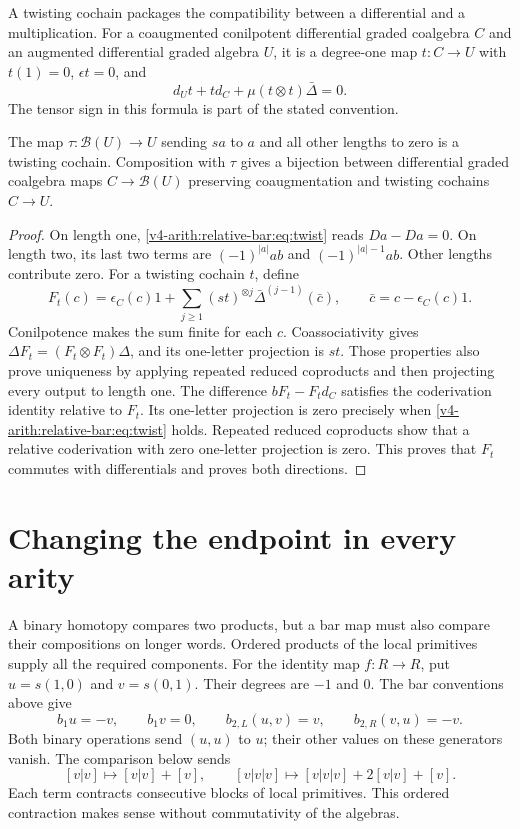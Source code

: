 A twisting cochain packages the compatibility between a differential
and a multiplication. For a coaugmented conilpotent differential
graded coalgebra $C$ and an augmented differential graded algebra $U$,
it is a degree-one map $t:C\to U$ with $t(1)=0$, $\epsilon t=0$, and
\begin{equation}\label{v4-arith:relative-bar:eq:twist}
 d_Ut+t d_C+\mu(t\otimes t)\bar\Delta=0.
\end{equation}
The tensor sign in this formula is part of the stated convention.

\begin{theorem}\label{v4-arith:relative-bar:thm:universal}
The map $\tau:\mathcal{B}(U)\to U$ sending $sa$ to $a$ and all other
lengths to zero is a twisting cochain. Composition with $\tau$ gives
a bijection between differential graded coalgebra maps
$C\to\mathcal{B}(U)$ preserving coaugmentation and twisting cochains
$C\to U$.
\end{theorem}
\begin{proof}
On length one, \eqref{v4-arith:relative-bar:eq:twist} reads $Da-Da=0$.
On length two, its last two terms are
$(-1)^{|a|}ab$ and $(-1)^{|a|-1}ab$. Other lengths contribute zero.
For a twisting cochain $t$, define
\[
 F_t(c)=\epsilon_C(c)1+
 \sum_{j\ge1}(st)^{\otimes j}\bar\Delta^{(j-1)}(\bar c),
 \qquad\bar c=c-\epsilon_C(c)1.
\]
Conilpotence makes the sum finite for each $c$. Coassociativity gives
$\Delta F_t=(F_t\otimes F_t)\Delta$, and its one-letter projection
is $st$. Those properties also prove uniqueness by applying repeated
reduced coproducts and then projecting every output to length one.
The difference $bF_t-F_td_C$ satisfies the coderivation identity
relative to $F_t$. Its one-letter projection is zero precisely when
\eqref{v4-arith:relative-bar:eq:twist} holds. Repeated reduced coproducts show that a relative
coderivation with zero one-letter projection is zero. This proves that
$F_t$ commutes with differentials and proves both directions.
\end{proof}

\section{Changing the endpoint in every arity}

A binary homotopy compares two products, but a bar map must also
compare their compositions on longer words. Ordered products of the
local primitives supply all the required components.
For the identity map $f:R\to R$, put $u=s(1,0)$ and $v=s(0,1)$.
Their degrees are $-1$ and $0$. The bar conventions above give
\[
 b_1u=-v,\qquad b_1v=0,\qquad
 b_{2,L}(u,v)=v,\qquad b_{2,R}(v,u)=-v.
\]
Both binary operations send $(u,u)$ to $u$; their other values on
these generators vanish. The comparison below sends
\[
 [v|v]\longmapsto[v|v]+[v],\qquad
 [v|v|v]\longmapsto[v|v|v]+2[v|v]+[v].
\]
Each term contracts consecutive blocks of local primitives. This
ordered contraction makes sense without commutativity of the algebras.

